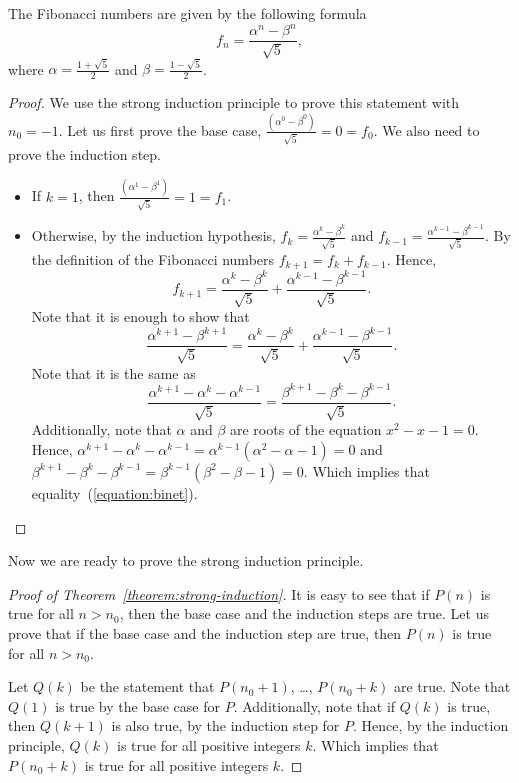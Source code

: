 \begin{theorem}
  The Fibonacci numbers are given by the following formula
  \[
      f_n = \frac{\alpha^n - \beta^n}{\sqrt{5}},
  \]
  where $\alpha = \frac{1 + \sqrt{5}}{2}$ and
  $\beta = \frac{1 - \sqrt{5}}{2}$.
\end{theorem}
\begin{proof}
  We use the strong induction principle to prove this statement with $n_0 = -1$.
  Let us first prove the base case,
  $\frac{(\alpha^0 - \beta^0)}{\sqrt{5}} = 0 = f_0$.
  We also need to prove the induction step.
  \begin{itemize}
    \item If $k = 1$, then $\frac{(\alpha^1 - \beta^1)}{\sqrt{5}} = 1 = f_1$.
    \item Otherwise, by the induction hypothesis,
      $f_k = \frac{\alpha^k - \beta^k}{\sqrt{5}}$ and
      $f_{k - 1} = \frac{\alpha^{k - 1} - \beta^{k - 1}}{\sqrt{5}}$.
      By the definition of the Fibonacci numbers $f_{k + 1} = f_k + f_{k - 1}$.
      Hence,
      \[
        f_{k + 1} = \frac{\alpha^k - \beta^k}{\sqrt{5}} +
        \frac{\alpha^{k - 1} - \beta^{k - 1}}{\sqrt{5}}.
      \]
      Note that it is enough to show that
      \begin{equation}
      \label{equation:binet}
        \frac{\alpha^{k + 1} - \beta^{k + 1}}{\sqrt{5}} =
        \frac{\alpha^k - \beta^k}{\sqrt{5}} +
        \frac{\alpha^{k - 1} - \beta^{k - 1}}{\sqrt{5}}.
      \end{equation}
      Note that it is the same as
      \[
        \frac{\alpha^{k + 1} - \alpha^k - \alpha^{k - 1}}{\sqrt{5}} =
        \frac{\beta^{k + 1} - \beta^k - \beta^{k - 1}}{\sqrt{5}}.
      \]
      Additionally, note that $\alpha$ and $\beta$ are roots of the equation
      $x^2 - x - 1 = 0$. Hence,
      $\alpha^{k + 1} - \alpha^k - \alpha^{k - 1} = \alpha^{k - 1}(\alpha^2 -
      \alpha - 1) = 0$ and
      $\beta^{k + 1} - \beta^k - \beta^{k - 1} =
      \beta^{k - 1}(\beta^2 - \beta - 1) = 0$. Which implies that
      equality~(\ref{equation:binet}).
  \end{itemize}
\end{proof}

Now we are ready to prove the strong induction principle.
\begin{proof}[Proof of Theorem~\ref{theorem:strong-induction}]
  It is easy to see that if $P(n)$ is true for all $n > n_0$, then the base
  case and the induction steps are true. Let us prove that if the base case and
  the induction step are true, then $P(n)$ is true for all $n > n_0$.

  Let $Q(k)$ be the statement that $P(n_0 + 1)$, \dots, $P(n_0 + k)$ are true.
  Note that $Q(1)$ is true by the base case for $P$. Additionally, note that if
  $Q(k)$ is true, then $Q(k + 1)$ is also true, by the induction step for $P$.
  Hence, by the induction principle, $Q(k)$ is true for all positive integers
  $k$. Which implies that $P(n_0 + k)$ is true for all positive integers $k$.
\end{proof}

